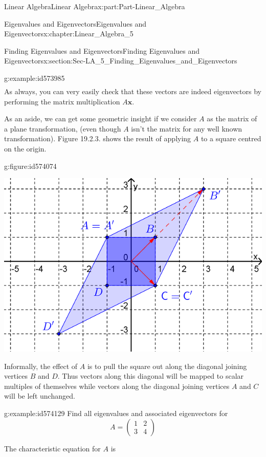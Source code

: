 \documentclass[oneside,10pt,]{book}
\numberwithin{equation}{section}
\newcommand{\amp}{&}
\begin{document}
\begin{partptx}{Linear Algebra}{}{Linear Algebra}{}{}{x:part:Part-Linear_Algebra}
\begin{chapterptx}{Eigenvalues and Eigenvectors}{}{Eigenvalues and Eigenvectors}{}{}{x:chapter:Linear_Algebra_5}
\begin{sectionptx}{Finding Eigenvalues and Eigenvectors}{}{Finding Eigenvalues and Eigenvectors}{}{}{x:section:Sec-LA_5_Finding_Eigenvalues_and_Eigenvectors}
\begin{example}{}{g:example:id573985}
\begin{align*}
\end{align*}
As always, you can very easily check that these vectors are indeed eigenvectors by performing the matrix multiplication \(A\mathbf{x}\).%
\par
As an aside, we can get some geometric insight if we consider \(A\) as the matrix of a plane transformation, (even though \(A\) isn’t the matrix for any well known transformation). Figure 19.2.3. shows the result of applying \(A\) to a square centred on the origin. \begin{figureptx}{}{g:figure:id574074}{}%
\begin{image}{0.125}{0.75}{0.125}%
\includegraphics[width=\linewidth]{./LinearAlgebra/Images/5/figure2.png}
\end{image}%
\tcblower
\end{figureptx}%
 Informally, the effect of \(A\) is to pull the square out along the diagonal joining vertices \(B\) and \(D\). Thus vectors along this diagonal will be mapped to scalar multiples of themselves while vectors along the diagonal joining vertices \(A\) and \(C\) will be left unchanged.%
\end{example}
\begin{example}{}{g:example:id574129}%
Find all eigenvalues and associated eigenvectors for%
\begin{equation*}
A=\begin{pmatrix} 1 \amp 2 \\ 3 \amp 4 \end{pmatrix} 
\end{equation*}
%
\par\smallskip%
\noindent\hypertarget{g:solution:id574114}{}The characteristic equation for \(A\) is%
\begin{align*}

\end{align*}
\end{example}
\end{sectionptx}
\end{chapterptx}
\end{partptx}
\end{document}
